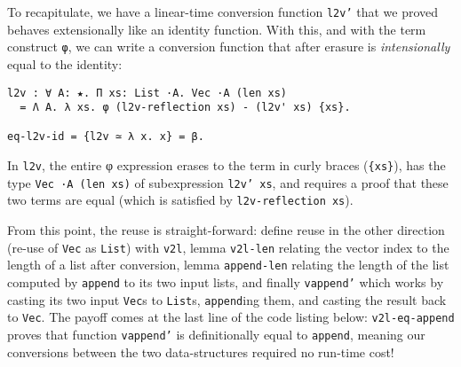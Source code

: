 \documentclass{article}
\begin{document}
To recapitulate, we have a linear-time conversion function \texttt{l2v'} that
we proved behaves extensionally like an identity function. With this, and with the term
construct \texttt{φ}, we can write a conversion function that after erasure is
\textit{intensionally} equal to the identity:

\begin{verbatim}
l2v : ∀ A: ★. Π xs: List ·A. Vec ·A (len xs)
  = Λ A. λ xs. φ (l2v-reflection xs) - (l2v' xs) {xs}.

eq-l2v-id = {l2v ≃ λ x. x} = β.
\end{verbatim}
\noindent In \texttt{l2v}, the entire φ expression erases to the term in curly braces
(\texttt{\{xs\}}), has the type \texttt{Vec ·A (len xs)} of subexpression
\texttt{l2v' xs}, and requires a proof that these two terms are equal (which is
satisfied by \texttt{l2v-reflection xs}).

From this point, the reuse is straight-forward: define reuse in the other
direction (re-use of \texttt{Vec} as \texttt{List}) with \texttt{v2l}, lemma
\texttt{v2l-len} relating the vector index to the length of a list after
conversion, lemma \texttt{append-len} relating the length of the list computed
by \texttt{append} to its two input lists, and finally \texttt{vappend'} which
works by casting its two input \texttt{Vec}s to \texttt{List}s,
\texttt{append}ing them, and casting the result back to \texttt{Vec}. The payoff
comes at the last line of the code listing below: \texttt{v2l-eq-append} proves
that function \texttt{vappend'} is definitionally equal to \texttt{append},
meaning our conversions between the two data-structures required no run-time cost!
\end{document}

